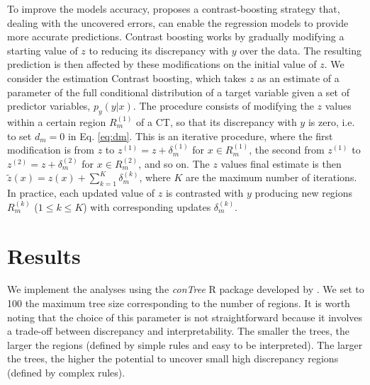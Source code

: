 \documentclass[a4,11pt]{article}
\begin{document}
To improve the models accuracy, \cite{Friedman2020} proposes a contrast-boosting strategy that, dealing with the uncovered errors, can enable the regression models to provide more accurate predictions. Contrast boosting works by gradually modifying a starting value of $z$ to reducing its discrepancy with $y$ over the data. The resulting prediction is then affected by these modifications on the initial value of $z$.
We consider the estimation Contrast boosting, which takes $z$ as an estimate of a parameter of the full conditional distribution of a target variable given a set of predictor variables, $p_y(y | x)$.
The procedure consists of modifying the $z$ values within a certain region $R_m^{(1)}$ of a CT, so that its discrepancy with $y$ is zero, i.e. to set $d_m=0$ in Eq. \ref{eq:dm}.
This is an iterative procedure, where the first modification is from $z$ to $z^{(1)}=z+\delta^{(1)}_m$ for $x\in R^{(1)}_m$, the second from $z^{(1)}$ to $z^{(2)}=z+\delta^{(2)}_m$ for $x\in R^{(2)}_m$, and so on.
The $z$ values final estimate is then $\tilde{z}(x)=z(x)+\sum_{k=1}^{K}\delta_{m}^{(k)}$, where $K$ are the maximum number of iterations. In practice, each updated value of $z$ is contrasted with $y$ producing new regions $R^{(k)}_m$ ($1\leq k\leq K$) with corresponding updates $\delta_{m}^{(k)}$.

\section{Results}
We implement the analyses using the \textit{conTree} R package developed by \cite{FriedmanNarasimhan2020}.
We set to 100 the maximum tree size corresponding to the number of regions. It is worth noting that the choice of this parameter is not straightforward because it involves a trade-off between discrepancy and interpretability. The smaller the trees, the larger the regions (defined by simple rules and easy to be interpreted). The larger the trees, the higher the potential to uncover small high discrepancy regions (defined by complex rules).
\end{document}

